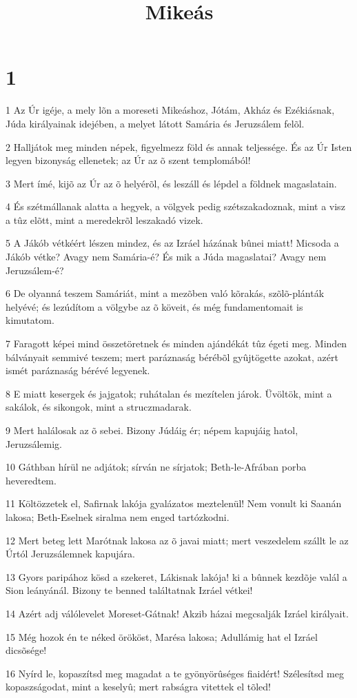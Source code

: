 

\title{Mikeás}


\chapter{1}

\par 1 Az Úr igéje, a mely lõn a moreseti Mikeáshoz, Jótám, Akház és Ezékiásnak, Júda királyainak idejében, a melyet látott Samária és Jeruzsálem felõl.
\par 2 Halljátok meg minden népek, figyelmezz föld és annak teljessége. És az Úr Isten legyen bizonyság ellenetek; az Úr az õ szent templomából!
\par 3 Mert ímé, kijõ az Úr az õ helyérõl, és leszáll és lépdel a földnek magaslatain.
\par 4 És szétmállanak alatta a hegyek, a völgyek pedig szétszakadoznak, mint a visz a tûz elõtt, mint a meredekrõl leszakadó vizek.
\par 5 A Jákób vétkéért lészen mindez, és az Izráel házának bûnei miatt! Micsoda a Jákób vétke? Avagy nem Samária-é? És mik a Júda magaslatai? Avagy nem Jeruzsálem-é?
\par 6 De olyanná teszem Samáriát, mint a mezõben való kõrakás, szõlõ-plánták helyévé; és lezúdítom a völgybe az õ köveit, és még fundamentomait is kimutatom.
\par 7 Faragott képei mind összetöretnek és minden ajándékát tûz égeti meg. Minden bálványait semmivé teszem; mert paráznaság bérébõl gyûjtögette azokat, azért ismét paráznaság bérévé legyenek.
\par 8 E miatt kesergek és jajgatok; ruhátalan és mezítelen járok. Üvöltök, mint a sakálok, és sikongok, mint a struczmadarak.
\par 9 Mert halálosak az õ sebei. Bizony Júdáig ér; népem kapujáig hatol, Jeruzsálemig.
\par 10 Gáthban hírül ne adjátok; sírván ne sírjatok; Beth-le-Afrában porba heveredtem.
\par 11 Költözzetek el, Safirnak lakója gyalázatos meztelenül! Nem vonult ki Saanán lakosa; Beth-Eselnek siralma nem enged tartózkodni.
\par 12 Mert beteg lett Marótnak lakosa az õ javai miatt; mert veszedelem szállt le az Úrtól Jeruzsálemnek kapujára.
\par 13 Gyors paripához kösd a szekeret, Lákisnak lakója! ki a bûnnek kezdõje valál a Sion leányánál. Bizony te benned találtatnak Izráel vétkei!
\par 14 Azért adj válólevelet Moreset-Gátnak! Akzib házai megcsalják Izráel királyait.
\par 15 Még hozok én te néked örököst, Marésa lakosa; Adullámig hat el Izráel dicsõsége!
\par 16 Nyírd le, kopaszítsd meg magadat a te gyönyörûséges fiaidért! Szélesítsd meg kopaszságodat, mint a keselyû; mert rabságra vitettek el tõled!

